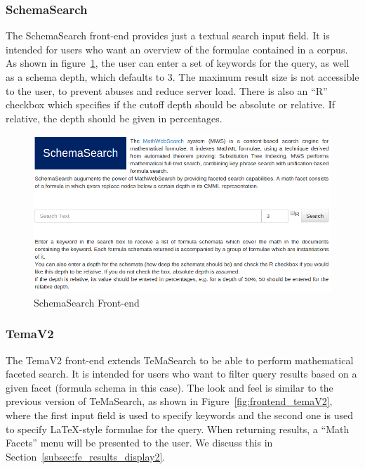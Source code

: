 \documentclass[a4paper,oneside]{article}
\def\tms{\textsf{TeMaSearch}\xspace}
\def\latex{\LaTeX\xspace}
\begin{document}
\subsubsection{SchemaSearch}
The \textsf{SchemaSearch} front-end provides just a textual search input field.
It is intended for users who want an overview of the formulae contained in a
corpus.
As shown in figure~\ref{fig:frontend_schema}, the user can enter a set of
keywords for the query, as well as a schema depth, which defaults to 3. The
maximum result size is not accessible to the user, to prevent abuses and reduce
server load.  There is also an ``R'' checkbox which specifies if the cutoff
depth should be absolute or relative. If relative, the depth should be given in
percentages.

\begin{figure}[ht]\centering
    \includegraphics[width=12.1cm]{img/frontend_schema.png}
    \caption{SchemaSearch Front-end}\label{fig:frontend_schema}
\end{figure}
\FloatBarrier

\subsubsection{TemaV2}
The \textsf{TemaV2} front-end extends \tms to be able to perform mathematical
faceted search. It is intended for users who want to filter query results based
on a given facet (formula schema in this case).
The look and feel is similar to the previous version of \tms,
as shown in Figure~\ref{fig:frontend_temaV2}, where the first input field is
used to specify keywords and the second one is used to specify \latex-style
formulae for the query. When returning results, a ``Math Facets'' menu will be
presented to the user. We discuss this in
Section~\ref{subsec:fe_results_display2}.
\end{document}
